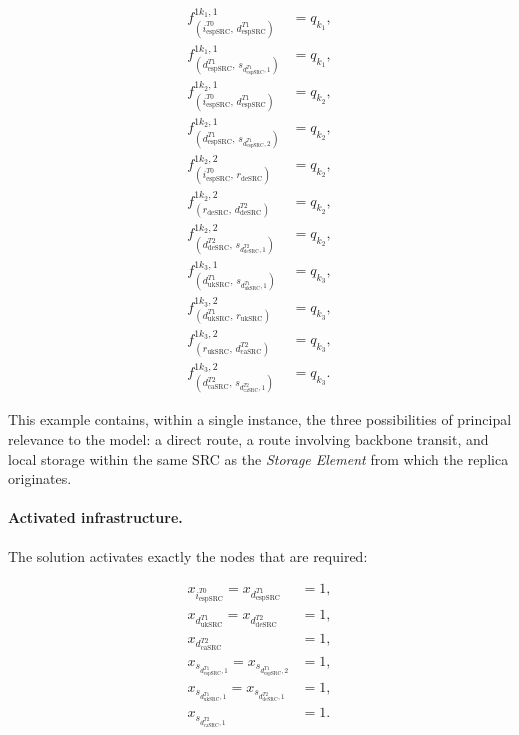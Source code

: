 \documentclass[a4paper,fleqn]{cas-dc}
\begin{document}
\begin{align*}
f_{(i_{\mathrm{espSRC}}^{T0},\, d_{\mathrm{espSRC}}^{T1})}^{1k_1,1} &= q_{k_1}, \\[0.5ex]
f_{(d_{\mathrm{espSRC}}^{T1},\, s_{d_{\mathrm{espSRC}}^{T1},1})}^{1k_1,1} &= q_{k_1}, \\[1.5ex]
f_{(i_{\mathrm{espSRC}}^{T0},\, d_{\mathrm{espSRC}}^{T1})}^{1k_2,1} &= q_{k_2}, \\[0.5ex]
f_{(d_{\mathrm{espSRC}}^{T1},\, s_{d_{\mathrm{espSRC}}^{T1},2})}^{1k_2,1} &= q_{k_2}, \\[1.5ex]
f_{(i_{\mathrm{espSRC}}^{T0},\, r_{\mathrm{deSRC}})}^{1k_2,2} &= q_{k_2}, \\[0.5ex]
f_{(r_{\mathrm{deSRC}},\, d_{\mathrm{deSRC}}^{T2})}^{1k_2,2} &= q_{k_2}, \\[0.5ex]
f_{(d_{\mathrm{deSRC}}^{T2},\, s_{d_{\mathrm{deSRC}}^{T2},1})}^{1k_2,2} &= q_{k_2}, \\[1.5ex]
f_{(d_{\mathrm{ukSRC}}^{T1},\, s_{d_{\mathrm{ukSRC}}^{T1},1})}^{1k_3,1} &= q_{k_3}, \\[1.5ex]
f_{(d_{\mathrm{ukSRC}}^{T1},\, r_{\mathrm{ukSRC}})}^{1k_3,2} &= q_{k_3}, \\[0.5ex]
f_{(r_{\mathrm{ukSRC}},\, d_{\mathrm{caSRC}}^{T2})}^{1k_3,2} &= q_{k_3}, \\[0.5ex]
f_{(d_{\mathrm{caSRC}}^{T2},\, s_{d_{\mathrm{caSRC}}^{T2},1})}^{1k_3,2} &= q_{k_3}.
\end{align*}



This example contains, within a single instance, the three possibilities of principal relevance to the model: a direct route, a route involving backbone transit, and local storage within the same SRC as the \emph{Storage Element} from which the replica originates.

\paragraph{Activated infrastructure.} 

The solution activates exactly the nodes that are required:

\begin{align*}
x_{i_{\mathrm{espSRC}}^{T0}} = x_{d_{\mathrm{espSRC}}^{T1}} &= 1, \\
x_{d_{\mathrm{ukSRC}}^{T1}} = x_{d_{\mathrm{deSRC}}^{T2}} &= 1, \\
x_{d_{\mathrm{caSRC}}^{T2}} &= 1, \\[1.5ex]
x_{s_{d_{\mathrm{espSRC}}^{T1},1}} = x_{s_{d_{\mathrm{espSRC}}^{T1},2}} &= 1, \\
x_{s_{d_{\mathrm{ukSRC}}^{T1},1}} = x_{s_{d_{\mathrm{deSRC}}^{T2},1}} &= 1, \\
x_{s_{d_{\mathrm{caSRC}}^{T2},1}} &= 1.
\end{align*}
\end{document}
